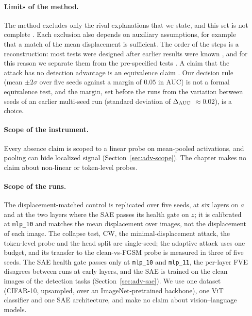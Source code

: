 \documentclass[../ppgc-tese.tex]{subfiles}
\begin{document}
\paragraph*{Limits of the method.}
The method excludes only the rival explanations that we state, and this set is
not complete \cite{odonohue2001weaknesses_strong_inference}. Each exclusion
also depends on auxiliary assumptions, for example that a match of the mean
displacement is sufficient. The order of the steps is a reconstruction: most
tests were designed after earlier results were known
\cite{gelman2014statistical_crisis}, and for this reason we separate them from
the pre-specified tests
\cite{nosek2018preregistration_revolution,wagenmakers2012confirmatory_agenda}.
A claim that the attack has no detection advantage is an equivalence claim
\cite{lakens2017equivalence_tests}. Our decision rule (mean $\pm2\sigma$ over
five seeds against a margin of $0.05$ in AUC) is not a formal equivalence
test, and the margin, set before the runs from the variation between seeds of
an earlier multi-seed run (standard deviation of $\Delta_{\mathrm{AUC}}$ $\approx0.02$), is a
choice.

\paragraph*{Scope of the instrument.}
Every absence claim is scoped to a linear probe on mean-pooled activations,
and pooling can hide localized signal (Section~\ref{sec:adv-scope}). The
chapter makes no claim about non-linear or token-level probes.

\paragraph*{Scope of the runs.}
The displacement-matched control is replicated over five seeds, at six layers
on $a$ and at the two layers where the SAE passes its health gate on $z$; it
is calibrated at \texttt{mlp\_10} and matches the mean displacement over
images, not the displacement of each image. The collapse test, CW, the
minimal-displacement attack, the token-level probe and the head split are
single-seed; the adaptive attack uses one budget, and its transfer to the
clean-vs-FGSM probe is measured in three of five seeds. The SAE health gate
passes only at \texttt{mlp\_10} and \texttt{mlp\_11}, the per-layer FVE
disagrees between runs at early layers, and the SAE is trained on the clean
images of the detection tasks (Section~\ref{sec:adv-sae}). We use one dataset
(CIFAR-10, upsampled, over an ImageNet-pretrained backbone), one ViT
classifier and one SAE architecture, and make no claim about vision--language
models.
\end{document}
